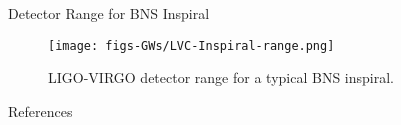 \documentclass[size=11pt,style=paintings]{powerdot}
\begin{document}
\begin{slide}{Detector Range for BNS Inspiral}
 
 \begin{figure}
 \centering
   \texttt{[image: figs-GWs/LVC-Inspiral-range.png]}
  \caption{LIGO-VIRGO detector range for a typical BNS inspiral.}
\label{fig:polarization}
\end{figure}
 \end{slide}
 
 
 
\begin{slide}{References}


\end{slide}

%
%
\end{document}

